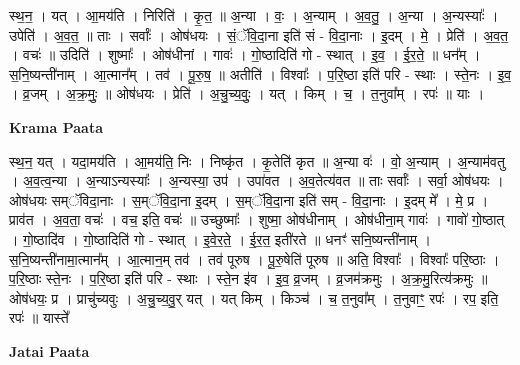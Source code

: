 \documentclass[17pt]{extarticle}
\begin{document}
स्थ॒न॒ । यत् । आ॒मय॑ति । निरिति॑ । कृ॒त॒ ॥ अ॒न्या । वः॒ । अ॒न्याम् । अ॒व॒तु॒ । अ॒न्या । अ॒न्यस्याः᳚ । उपेति॑ । अ॒व॒त॒ ॥ ताः । सर्वाः᳚ । ओष॑धयः । सं॒ॅवि॒दा॒ना इति॑ सं - वि॒दा॒नाः । इ॒दम् । मे॒ । प्रेति॑ । अ॒व॒त॒ । वचः॑ ॥ उदिति॑ । शुष्माः᳚ । ओष॑धीनां । गावः॑ । गो॒ष्ठादिति॑ गो - स्थात् । इ॒व॒ । ई॒र॒ते॒ ॥ धन᳚म् । स॒नि॒ष्यन्ती॑नाम् । आ॒त्मान᳚म् । तव॑ । पू॒रु॒ष॒ ॥ अतीति॑ । विश्वाः᳚ । प॒रि॒ष्ठा इति॑ परि - स्थाः । स्ते॒नः । इ॒व॒ । व्र॒जम् । अ॒क्र॒मुः॒ ॥ ओष॑धयः । प्रेति॑ । अ॒चु॒च्य॒वुः॒ । यत् । किम् । च॒ । त॒नुवा᳚म् । रपः॑ ॥ याः ।  \newline


\textbf{Krama Paata} \newline

स्थ॒न॒ यत् । यदा॒मय॑ति । आ॒मय॑ति॒ निः । निष्कृ॑त । कृ॒तेति॑ कृत ॥ अ॒न्या वः॑ । वो॒ अ॒न्याम् । अ॒न्याम॑वतु । अ॒व॒त्व॒न्या । अ॒न्याऽन्यस्याः᳚ । अ॒न्यस्या॒ उप॑ । उपा॑वत । अ॒व॒तेत्य॑वत ॥ ताः सर्वाः᳚ । सर्वा॒ ओष॑धयः । ओष॑धयः सम्ॅविदा॒नाः । स॒म्ॅवि॒दा॒ना इ॒दम् । स॒म्ॅवि॒दा॒ना इति॑ सम् - वि॒दा॒नाः । इ॒दम् मे᳚ । मे॒ प्र । प्राव॑त । अ॒व॒ता॒ वचः॑ । वच॒ इति॒ वचः॑ ॥ उच्छुष्माः᳚ । शुष्मा॒ ओष॑धीनाम् । ओष॑धीना॒म् गावः॑ । गावो॑ गो॒ष्ठात् । गो॒ष्ठादि॑व । गो॒ष्ठादिति॑ गो - स्थात् । इ॒वे॒र॒ते॒ । ई॒र॒त॒ इती॑रते ॥ धनꣳ॑ सनि॒ष्यन्ती॑नाम् । स॒नि॒ष्यन्ती॑नामा॒त्मान᳚म् । आ॒त्मान॒म् तव॑ । तव॑ पूरुष । पू॒रु॒षेति॑ पूरुष ॥ अति॒ विश्वाः᳚ । विश्वाः᳚ परि॒ष्ठाः । प॒रि॒ष्ठाः स्ते॒नः । प॒रि॒ष्ठा इति॑ परि - स्थाः । स्ते॒न इ॑व । इ॒व॒ व्र॒जम् । व्र॒जम॑क्रमुः । अ॒क्र॒मु॒रित्य॑क्रमुः ॥ ओष॑धयः॒ प्र । प्राचु॑च्यवुः । अ॒चु॒च्य॒वु॒र् यत् । यत् किम् । किञ्च॑ । च॒ त॒नुवा᳚म् । त॒नुवाꣳ॒॒ रपः॑ । रप॒ इति॒ रपः॑ ॥ यास्ते᳚ \newline

\textbf{Jatai Paata} \newline
\end{document}
